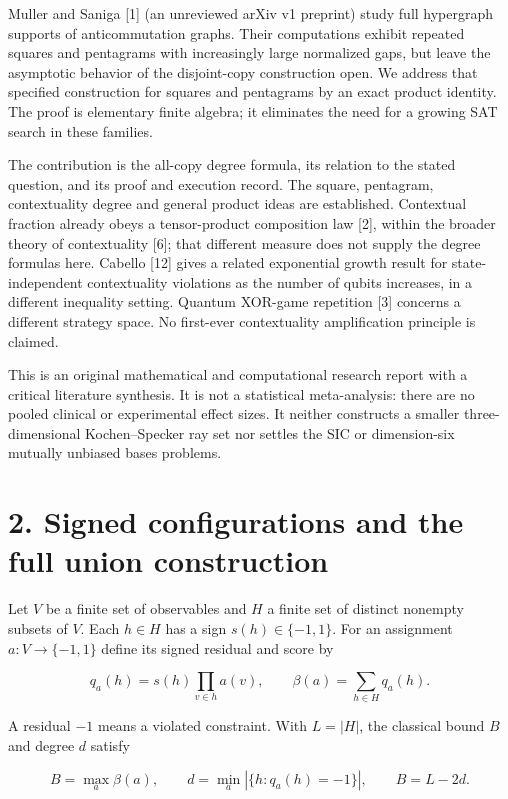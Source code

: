 \documentclass[10pt,a4paper]{article}
\begin{document}
Muller and Saniga {[}1{]} (an unreviewed arXiv v1 preprint) study full hypergraph supports of anticommutation graphs. Their computations exhibit repeated squares and pentagrams with increasingly large normalized gaps, but leave the asymptotic behavior of the disjoint-copy construction open. We address that specified construction for squares and pentagrams by an exact product identity. The proof is elementary finite algebra; it eliminates the need for a growing SAT search in these families.

The contribution is the all-copy degree formula, its relation to the stated question, and its proof and execution record. The square, pentagram, contextuality degree and general product ideas are established. Contextual fraction already obeys a tensor-product composition law {[}2{]}, within the broader theory of contextuality {[}6{]}; that different measure does not supply the degree formulas here. Cabello {[}12{]} gives a related exponential growth result for state-independent contextuality violations as the number of qubits increases, in a different inequality setting. Quantum XOR-game repetition {[}3{]} concerns a different strategy space. No first-ever contextuality amplification principle is claimed.

This is an original mathematical and computational research report with a critical literature synthesis. It is not a statistical meta-analysis: there are no pooled clinical or experimental effect sizes. It neither constructs a smaller three-dimensional Kochen--Specker ray set nor settles the SIC or dimension-six mutually unbiased bases problems.

\section{2. Signed configurations and the full union construction}\label{signed-configurations-and-the-full-union-construction}

Let \(V\) be a finite set of observables and \(H\) a finite set of distinct nonempty subsets of \(V\). Each \(h\in H\) has a sign \(s(h)\in\{-1,1\}\). For an assignment \(a:V\to\{-1,1\}\) define its signed residual and score by

\[q_a(h)=s(h)\prod_{v\in h}a(v),\qquad
\beta(a)=\sum_{h\in H}q_a(h).\]

A residual \(-1\) means a violated constraint. With \(L=|H|\), the classical bound \(B\) and degree \(d\) satisfy

\[B=\max_a\beta(a),\qquad d=\min_a|\{h:q_a(h)=-1\}|,
\qquad B=L-2d. \tag{1}\]
\end{document}
